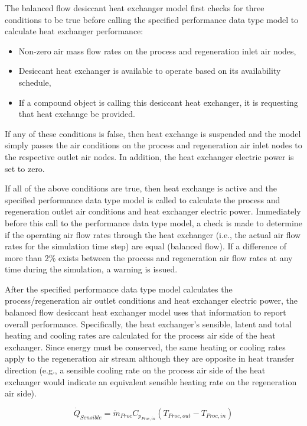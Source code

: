 The balanced flow desiccant heat exchanger model first checks for three conditions to be true before calling the specified performance data type model to calculate heat exchanger performance:

\begin{itemize}
\item Non-zero air mass flow rates on the process and regeneration inlet air nodes,
\item Desiccant heat exchanger is available to operate based on its availability schedule,
\item If a compound object is calling this desiccant heat exchanger, it is requesting that heat exchange be provided.
\end{itemize}

If any of these conditions is false, then heat exchange is suspended and the model simply passes the air conditions on the process and regeneration air inlet nodes to the respective outlet air nodes. In addition, the heat exchanger electric power is set to zero.

If all of the above conditions are true, then heat exchange is active and the specified performance data type model is called to calculate the process and regeneration outlet air conditions and heat exchanger electric power. Immediately before this call to the performance data type model, a check is made to determine if the operating air flow rates through the heat exchanger (i.e., the actual air flow rates for the simulation time step) are equal (balanced flow). If a difference of more than 2\% exists between the process and regeneration air flow rates at any time during the simulation, a warning is issued.

After the specified performance data type model calculates the process/regeneration air outlet conditions and heat exchanger electric power, the balanced flow desiccant heat exchanger model uses that information to report overall performance. Specifically, the heat exchanger's sensible, latent and total heating and cooling rates are calculated for the process air side of the heat exchanger. Since energy must be conserved, the same heating or cooling rates apply to the regeneration air stream although they are opposite in heat transfer direction (e.g., a sensible cooling rate on the process air side of the heat exchanger would indicate an equivalent sensible heating rate on the regeneration air side).

\begin{equation}
{\dot{Q}_{Sensible}} = {\dot{m}_{Proc}} {C_{p_{Proc,in}}} \left( {{T_{Proc,out}} - {T_{Proc,in}}} \right)
\end{equation}

